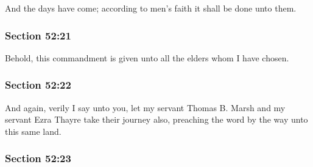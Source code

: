 		And the days have come; according to men's faith it shall be done unto them.


	\subsubsection{Section 52:21} %
		\label{DC52-21}

		Behold, this commandment is given unto all the elders whom I have chosen.


	\subsubsection{Section 52:22} %
		\label{DC52-22}

		And again, verily I say unto you, let my servant Thomas B. Marsh and my servant Ezra Thayre take their journey also, preaching the word by the way unto this same land.


	\subsubsection{Section 52:23} %
		\label{DC52-23}

